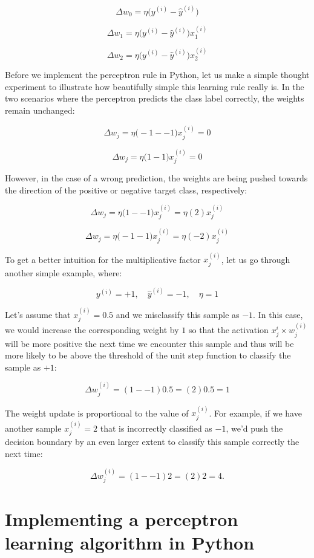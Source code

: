 \documentclass{report}
\begin{document}
\[
\Delta w_0 = \eta \bigg(  y^{(i)} - \hat{y}^{(i)} \bigg) 
\]

\[
\Delta w_1 = \eta \bigg(  y^{(i)} - \hat{y}^{(i)} \bigg) x_{1}^{(i)}
\]

\[
\Delta w_2 = \eta \bigg(  y^{(i)} - \hat{y}^{(i)} \bigg) x_{2}^{(i)}
\]

Before we implement the perceptron rule in Python, let us make a simple thought experiment to illustrate how beautifully simple this learning rule really is. In the two scenarios where the perceptron predicts the class label correctly, the weights remain unchanged:

\[
\Delta w_j = \eta \bigg( -1 -- 1 \bigg)x_{j}^{(i)} = 0
\]

\[
\Delta w_j = \eta \bigg( 1-1 \bigg)x_{j}^{(i)} = 0
\]

However, in the case of a wrong prediction, the weights are being pushed towards the direction of the positive or negative target class, respectively:

\[
\Delta w_j = \eta \bigg( 1 -- 1 \bigg)x_{j}^{(i)} = \eta(2)x_{j}^{(i)}
\]

\[
\Delta w_j = \eta \bigg( -1-1 \bigg)x_{j}^{(i)} = \eta(-2)x_{j}^{(i)}
\]


To get a better intuition for the multiplicative factor $x_{j}^{(i)}$, let us go through another
simple example, where:

\[
y^{(i)} = +1, \quad \hat{y}^{(i)} = -1, \quad \eta = 1
 \]

Let's assume that $x_{j}^{(i)}=0.5$ and we misclassify this sample as $-1$. In this case, we would increase the corresponding weight by $1$ so that the activation $x_{j}^{i} \times w_{j}^{(i)}$ will be more positive the next time we encounter this sample and thus will be more likely to be above the threshold of the unit step function to classify the sample as  $+1$:

\[
\Delta w_{j}^{(i)} = (1--1)0.5 = (2)0.5 = 1
\]

The weight update is proportional to the value of $x_{j}^{(i)}$. For example, if we have another sample $x_{j}^{(i)}=2$ that is incorrectly classified as $-1$, we'd push the decision boundary by an even larger extent to classify this sample correctly the next time:

\[
\Delta w_{j}^{(i)} = (1--1)2 = (2)2 = 4.
\]


\section{Implementing a perceptron learning algorithm in Python}
\end{document}
